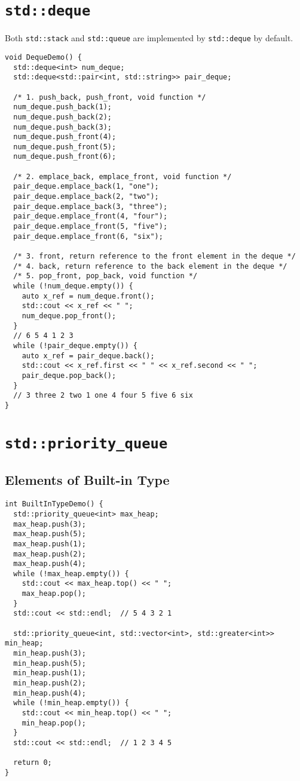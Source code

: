 \section{{\colorbox{CodeBackground}{\lstinline|std::deque|}}}
Both {\colorbox{CodeBackground}{\lstinline|std::stack|}} and {\colorbox{CodeBackground}{\lstinline|std::queue|}} are implemented by {\colorbox{CodeBackground}{\lstinline|std::deque|}} by default.

\begin{lstlisting}
void DequeDemo() {
  std::deque<int> num_deque;
  std::deque<std::pair<int, std::string>> pair_deque;

  /* 1. push_back, push_front, void function */
  num_deque.push_back(1);
  num_deque.push_back(2);
  num_deque.push_back(3);
  num_deque.push_front(4);
  num_deque.push_front(5);
  num_deque.push_front(6);

  /* 2. emplace_back, emplace_front, void function */
  pair_deque.emplace_back(1, "one");
  pair_deque.emplace_back(2, "two");
  pair_deque.emplace_back(3, "three");
  pair_deque.emplace_front(4, "four");
  pair_deque.emplace_front(5, "five");
  pair_deque.emplace_front(6, "six");

  /* 3. front, return reference to the front element in the deque */
  /* 4. back, return reference to the back element in the deque */
  /* 5. pop_front, pop_back, void function */
  while (!num_deque.empty()) {
    auto x_ref = num_deque.front();
    std::cout << x_ref << " ";
    num_deque.pop_front();
  }
  // 6 5 4 1 2 3
  while (!pair_deque.empty()) {
    auto x_ref = pair_deque.back();
    std::cout << x_ref.first << " " << x_ref.second << " ";
    pair_deque.pop_back();
  }
  // 3 three 2 two 1 one 4 four 5 five 6 six
}
\end{lstlisting}

\section{{\colorbox{CodeBackground}{\lstinline|std::priority_queue|}}}
\subsection{Elements of Built-in Type}
\begin{lstlisting}
int BuiltInTypeDemo() {
  std::priority_queue<int> max_heap;
  max_heap.push(3);
  max_heap.push(5);
  max_heap.push(1);
  max_heap.push(2);
  max_heap.push(4);
  while (!max_heap.empty()) {
    std::cout << max_heap.top() << " ";
    max_heap.pop();
  }
  std::cout << std::endl;  // 5 4 3 2 1

  std::priority_queue<int, std::vector<int>, std::greater<int>> min_heap;
  min_heap.push(3);
  min_heap.push(5);
  min_heap.push(1);
  min_heap.push(2);
  min_heap.push(4);
  while (!min_heap.empty()) {
    std::cout << min_heap.top() << " ";
    min_heap.pop();
  }
  std::cout << std::endl;  // 1 2 3 4 5

  return 0;
}
\end{lstlisting}

